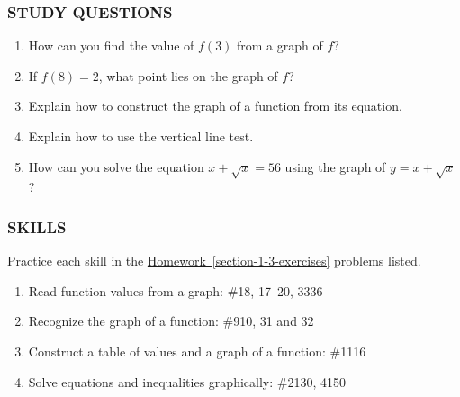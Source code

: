 \documentclass[10pt,]{book}
\theoremstyle{plain}
\theoremstyle{definition}
\theoremstyle{definition}
\theoremstyle{definition}
\theoremstyle{definition}
\numberwithin{equation}{part}
\begin{document}
\subsubsection[{STUDY QUESTIONS}]{STUDY QUESTIONS}\label{subsubsection-11}
\leavevmode%
\begin{enumerate}[label=\arabic*]
\item\hypertarget{li-644}{}How can you find the value of \(f (3)\) from a graph of \(f\)?%
\item\hypertarget{li-645}{}If \(f (8) = 2\), what point lies on the graph of \(f\)?%
\item\hypertarget{li-646}{}Explain how to construct the graph of a function from its equation.%
\item\hypertarget{li-647}{}Explain how to use the vertical line test.%
\item\hypertarget{li-648}{}How can you solve the equation \(x + \sqrt{x} = 56\) using the graph of \(y = x + \sqrt{x}\)?%
\end{enumerate}
%
\typeout{************************************************}
\typeout{************************************************}
\subsubsection[{SKILLS}]{SKILLS}\label{subsubsection-12}
Practice each skill in the \hyperref[section-1-3-exercises]{Homework~\ref{section-1-3-exercises}} problems listed. \leavevmode%
\begin{enumerate}[label=\arabic*]
\item\hypertarget{li-649}{}Read function values from a graph: \#1\textendash{}8, 17–20, 33\textendash{}36%
\item\hypertarget{li-650}{}Recognize the graph of a function: \#9\textendash{}10, 31 and 32%
\item\hypertarget{li-651}{}Construct a table of values and a graph of a function: \#11\textendash{}16%
\item\hypertarget{li-652}{}Solve equations and inequalities graphically: \#21\textendash{}30, 41\textendash{}50%
\end{enumerate}
%
\typeout{************************************************}
\typeout{************************************************}
\end{document}

